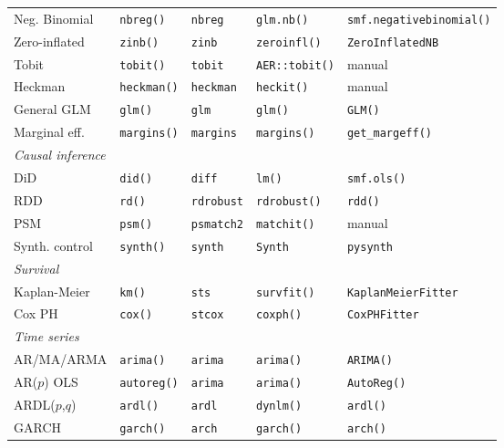 {\begin{longtable}{lllll}
Neg. Binomial   & \texttt{nbreg()}      & \texttt{nbreg}        & \texttt{glm.nb()}      & \texttt{smf.negativebinomial()} \\
Zero-inflated   & \texttt{zinb()}       & \texttt{zinb}         & \texttt{zeroinfl()}    & \texttt{ZeroInflatedNB} \\
Tobit           & \texttt{tobit()}      & \texttt{tobit}        & \texttt{AER::tobit()}  & manual \\
Heckman         & \texttt{heckman()}    & \texttt{heckman}      & \texttt{heckit()}      & manual \\
General GLM     & \texttt{glm()}        & \texttt{glm}          & \texttt{glm()}         & \texttt{GLM()} \\
Marginal eff.   & \texttt{margins()}    & \texttt{margins}      & \texttt{margins()}     & \texttt{get\_margeff()} \\
\midrule
\multicolumn{5}{l}{\textit{Causal inference}} \\
DiD             & \texttt{did()}        & \texttt{diff}         & \texttt{lm()}          & \texttt{smf.ols()} \\
RDD             & \texttt{rd()}         & \texttt{rdrobust}     & \texttt{rdrobust()}    & \texttt{rdd()} \\
PSM             & \texttt{psm()}        & \texttt{psmatch2}     & \texttt{matchit()}     & manual \\
Synth. control  & \texttt{synth()}      & \texttt{synth}        & \texttt{Synth}         & \texttt{pysynth} \\
\midrule
\multicolumn{5}{l}{\textit{Survival}} \\
Kaplan-Meier    & \texttt{km()}         & \texttt{sts}          & \texttt{survfit()}     & \texttt{KaplanMeierFitter} \\
Cox PH          & \texttt{cox()}        & \texttt{stcox}        & \texttt{coxph()}       & \texttt{CoxPHFitter} \\
\midrule
\multicolumn{5}{l}{\textit{Time series}} \\
AR/MA/ARMA      & \texttt{arima()}      & \texttt{arima}        & \texttt{arima()}       & \texttt{ARIMA()} \\
AR($p$) OLS     & \texttt{autoreg()}    & \texttt{arima}        & \texttt{arima()}       & \texttt{AutoReg()} \\
ARDL($p$,$q$)   & \texttt{ardl()}       & \texttt{ardl}         & \texttt{dynlm()}       & \texttt{ardl()} \\
GARCH           & \texttt{garch()}      & \texttt{arch}         & \texttt{garch()}       & \texttt{arch()} \\

\end{longtable}}
